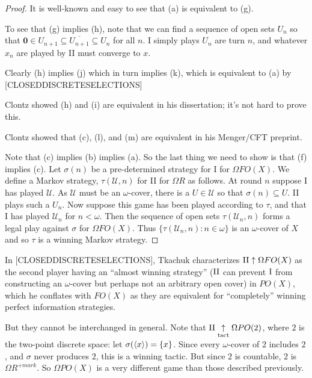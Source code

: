 \documentclass{amsart}
\theoremstyle{plain}
\theoremstyle{definition}
\theoremstyle{remark}
\theoremstyle{plain}
\theoremstyle{definition}
\theoremstyle{remark}
\begin{document}
\begin{proof}
 It is well-known and easy to see that (a) is equivalent to (g).

 To see that (g) implies (h), note that we can find a sequence of open sets \(U_n\) so that \(\mathbf 0 \in U_{n+1} \subseteq \overline{U_{n+1}} \subseteq U_n\) for all \(n\).
 I simply plays \(U_n\) are turn \(n\), and whatever \(x_n\) are played by II must converge to \(x\).

 Clearly (h) implies (j) which in turn implies (k), which is equivalent to (a) by [CLOSEDDISCRETESELECTIONS]

 Clontz showed (h) and (i) are equivalent in his dissertation; it's not hard to prove this.

 Clontz showed that (c), (l), and (m) are equivalent in his Menger/CFT preprint.

 Note that (c) implies (b) implies (a).
 So the last thing we need to show is that (f) implies (c).
 Let \(\sigma(n)\) be a pre-determined strategy for I for \(\Omega FO(X)\).
 We define a Markov strategy, \(\tau(\mathcal{U},n)\) for II for \(\Omega R\) as follows.
 At round \(n\) suppose I has played \(\mathcal{U}\).
 As \(\mathcal{U}\) must be an \(\omega\)-cover, there is a \(U \in \mathcal{U}\) so that \(\sigma(n) \subseteq U\).
 II plays such a \(U_n\).
 Now suppose this game has been played according to \(\tau\), and that I has played \(\mathcal{U}_n\) for \(n < \omega\).
 Then the sequence of open sets \(\tau(\mathcal{U}_n,n)\) forms a legal play against \(\sigma\) for \(\Omega FO(X)\).
 Thus \(\{\tau(\mathcal{U}_n,n) : n \in \omega\}\) is an \(\omega\)-cover of \(X\) and so \(\tau\) is a winning Markov strategy.
\end{proof}

In [CLOSEDDISCRETESELECTIONS], Tkachuk characterizes \(\mathrm{II}\uparrow\Omega FO(X)\) as the second player having an ``almost winning strategy'' (\(\mathrm{II}\) can prevent \(\mathrm{I}\) from constructing an \(\omega\)-cover but perhaps not an arbitrary open cover) in \(PO(X)\), which he conflates with \(FO(X)\) as they are equivalent for ``completely'' winning perfect information strategies. 

But they cannot be interchanged in general. 
Note that \(\mathrm{II}\underset{\text{tact}}{\uparrow}\Omega PO(2)\), where \(2\) is the two-point discrete space: let \(\sigma(\langle x\rangle)=\{x\}\). Since every \(\omega\)-cover of \(2\) includes \(2\), and \(\sigma\) never produces \(2\), this is a winning tactic. 
But since \(2\) is countable, \(2\) is \(\Omega R^{+mark}\). 
So \(\Omega PO(X)\) is a very different game than those described previously.
\end{document}
